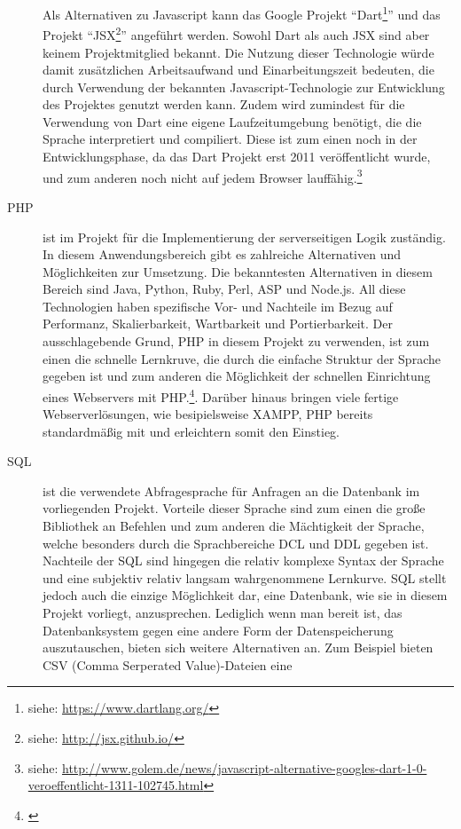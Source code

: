 \begin{description}
  Als Alternativen zu Javascript kann das Google Projekt
  "`Dart\footnote{siehe: \url{https://www.dartlang.org/}}"' und das Projekt
  "`JSX\footnote{siehe: \url{http://jsx.github.io/}}"' angeführt werden. Sowohl
  Dart als auch JSX sind aber keinem Projektmitglied bekannt. Die Nutzung
  dieser Technologie würde damit zusätzlichen Arbeitsaufwand und
  Einarbeitungszeit bedeuten, die durch Verwendung der bekannten
  Ja\-va\-script-Technologie zur Entwicklung des Projektes genutzt werden kann.
  Zudem wird zumindest für die Verwendung von Dart eine eigene Laufzeitumgebung
  benötigt, die die Sprache interpretiert und compiliert. Diese ist zum einen
  noch in der Entwicklungsphase, da das Dart Projekt erst 2011 veröffentlicht
  wurde, und zum anderen noch nicht auf jedem Browser
  lauffähig.\footnote{siehe: \url{http://www.golem.de/news/javascript-alternative-googles-dart-1-0-veroeffentlicht-1311-102745.html}}
  \item[PHP] ist im Projekt für die Implementierung der serverseitigen Logik
  zuständig. In diesem Anwendungsbereich gibt es zahlreiche Alternativen und
  Möglichkeiten zur Umsetzung. Die bekanntesten Alternativen in diesem Bereich
  sind Java, Python, Ruby, Perl, ASP und Node.js. All diese Technologien haben
  spezifische Vor- und Nachteile im Bezug auf Performanz, Skalierbarkeit,
  Wartbarkeit und Portierbarkeit. Der ausschlagebende Grund, PHP in diesem
  Projekt zu verwenden, ist zum einen die schnelle Lernkruve, die durch die
  einfache Struktur der Sprache gegeben ist und zum anderen die Möglichkeit der
  schnellen Einrichtung eines Webservers mit
  PHP.\footnote{\citet[S.~14]{peyton2005}}. Darüber hinaus bringen viele
  fertige Webserverlösungen, wie besipielsweise XAMPP, PHP bereits standardmäßig
  mit und erleichtern somit den Einstieg.
  \item[SQL] ist die verwendete Abfragesprache für Anfragen an die Datenbank im
  vorliegenden Projekt. Vorteile dieser Sprache sind zum einen die große
  Bibliothek an Befehlen und zum anderen die Mächtigkeit der Sprache, welche
  besonders durch die Sprachbereiche DCL und DDL gegeben ist.  Nachteile der SQL
  sind hingegen die relativ komplexe Syntax der Sprache und eine subjektiv
  relativ langsam wahrgenommene Lernkurve. SQL stellt jedoch auch die einzige
  Möglichkeit dar, eine Datenbank, wie sie in diesem Projekt vorliegt,
  anzusprechen. Lediglich wenn man bereit ist, das Datenbanksystem gegen eine
  andere Form der Datenspeicherung auszutauschen, bieten sich weitere
  Alternativen an. Zum Beispiel bieten CSV (Comma Serperated Value)-Dateien eine

\end{description}
